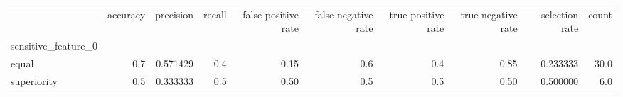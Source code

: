\begin{tabular}{lrrrrrrrrr}
\toprule
{} &  accuracy &  precision &  recall &  false positive rate &  false negative rate &  true positive rate &  true negative rate &  selection rate &  count \\
sensitive\_feature\_0 &           &            &         &                      &                      &                     &                     &                 &        \\
\midrule
equal               &       0.7 &   0.571429 &     0.4 &                 0.15 &                  0.6 &                 0.4 &                0.85 &        0.233333 &   30.0 \\
superiority         &       0.5 &   0.333333 &     0.5 &                 0.50 &                  0.5 &                 0.5 &                0.50 &        0.500000 &    6.0 \\
\bottomrule
\end{tabular}
